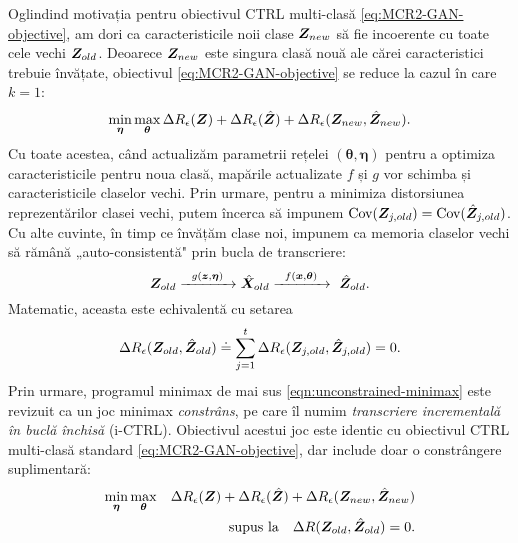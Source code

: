 \documentclass[../../book-main_ro.tex]{subfiles}
\begin{document}
Oglindind motivația pentru obiectivul CTRL multi-clasă \eqref{eq:MCR2-GAN-objective}, am dori ca caracteristicile noii clase $\bm{Z}_{new}$ să fie incoerente cu toate cele vechi $\bm{Z}_{old}$. Deoarece $\bm{Z}_{new}$ este singura clasă nouă ale cărei caracteristici trebuie învățate, obiectivul \eqref{eq:MCR2-GAN-objective} se reduce la cazul în care $k=1$:
\begin{equation}
\min_{\bm \eta} \max_{\bm \theta} \Delta{R_\epsilon(\bm{Z})} + \Delta{R_\epsilon(\hat{\bm{Z}})}+\Delta{R_\epsilon(\bm{Z}_{new},\hat{\bm{Z}}_{new})}.
\label{eqn:unconstrained-minimax}
\end{equation}
Cu toate acestea, când actualizăm parametrii rețelei $(\bm \theta,\bm \eta)$ pentru a optimiza caracteristicile pentru noua clasă, mapările actualizate $f$ și $g$ vor schimba și caracteristicile claselor vechi. Prin urmare, pentru a minimiza distorsiunea reprezentărilor clasei vechi, putem încerca să impunem $\mbox{Cov}(\bm{Z}_{j,old}) = \mbox{Cov}(\hat{\bm{Z}}_{j,old})$. Cu alte cuvinte, în timp ce învățăm clase noi, impunem ca memoria claselor vechi să rămână „auto-consistentă" prin bucla de transcriere:
\begin{equation}
\bm{Z}_{old} \xrightarrow{\hspace{2mm} g(\bm{z},\bm \eta) \hspace{2mm}} \hat {\bm{X}}_{old} \xrightarrow{\hspace{2mm} f(\bm{x}, \bm \theta)\hspace{2mm}} \ \hat {\bm{Z}}_{old}.
\end{equation}
Matematic, aceasta este echivalentă cu setarea
$$\Delta R_\epsilon(\bm{Z}_{old},\hat{\bm{Z}}_{old}) \doteq  \sum_{j=1}^t \Delta R_\epsilon(\bm{Z}_{j,old},\hat{\bm{Z}}_{j,old}) = 0.$$
Prin urmare, programul minimax de mai sus \eqref{eqn:unconstrained-minimax} este revizuit ca un joc minimax {\em constrâns}, pe care îl numim {\em transcriere incrementală în buclă închisă} (i-CTRL).
Obiectivul acestui joc este identic cu obiectivul CTRL multi-clasă standard \eqref{eq:MCR2-GAN-objective}, dar include doar o constrângere suplimentară:
\begin{eqnarray}
\min_{\bm \eta} \max_{\bm \theta}  &&\Delta{R_\epsilon(\bm{Z})}+\Delta{R_\epsilon(\hat{\bm{Z}})}+\Delta{R_\epsilon(\bm{Z}_{new},\hat{\bm{Z}}_{new})} \nonumber\\
&& \mbox{supus la} \quad  \Delta R(\bm{Z}_{old},\hat{\bm{Z}}_{old}) = 0.
\label{eqn:constrained-minimax}
\end{eqnarray}
\end{document}
